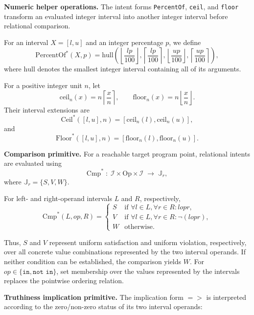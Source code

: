 \documentclass[11pt,oneside]{report}
\theoremstyle{plain}
\theoremstyle{definition}
\theoremstyle{remark}
\begin{document}
\smallskip
\noindent\textbf{Numeric helper operations.} The intent forms \texttt{PercentOf}, \texttt{ceil}, and
\texttt{floor} transform an evaluated integer interval into another integer
interval before relational comparison.

For an interval $X=[l,u]$ and an integer percentage $p$, we define
\[
\mathrm{PercentOf}^{*}(X,p)
=
\mathrm{hull}
\left(
\left\lfloor\frac{lp}{100}\right\rfloor,
\left\lceil\frac{lp}{100}\right\rceil,
\left\lfloor\frac{up}{100}\right\rfloor,
\left\lceil\frac{up}{100}\right\rceil
\right),
\]
where $\mathrm{hull}$ denotes the smallest integer interval containing all
of its arguments.

For a positive integer unit $n$, let
\[
\mathrm{ceil}_{n}(x)
=
n\left\lceil\frac{x}{n}\right\rceil,
\qquad
\mathrm{floor}_{n}(x)
=
n\left\lfloor\frac{x}{n}\right\rfloor.
\]
Their interval extensions are
\[
\mathrm{Ceil}^{*}([l,u],n)
=
[
\mathrm{ceil}_{n}(l),
\mathrm{ceil}_{n}(u)
],
\]
and
\[
\mathrm{Floor}^{*}([l,u],n)
=
[
\mathrm{floor}_{n}(l),
\mathrm{floor}_{n}(u)
].
\]

\smallskip
\noindent\textbf{Comparison primitive.}
For a reachable target program point, relational intents are evaluated using
\[
\mathrm{Cmp}^{*}
\;:\;
\mathcal{I} \times \mathrm{Op} \times \mathcal{I}
\;\to\;
\mathbb{J}_{r},
\]
where \(\mathbb{J}_{r}=\{S,V,W\}\).

For left- and right-operand intervals \(L\) and \(R\), respectively,
\[
\mathrm{Cmp}^{*}(L,\mathit{op},R)
=
\begin{cases}
S
&
\text{if }
\forall l \in L,\forall r \in R :
l \mathrel{\mathit{op}} r,
\\[2pt]
V
&
\text{if }
\forall l \in L,\forall r \in R :
\neg(l \mathrel{\mathit{op}} r),
\\[2pt]
W
&
\text{otherwise.}
\end{cases}
\]

Thus, \(S\) and \(V\) represent uniform satisfaction and uniform violation,
respectively, over all concrete value combinations represented by the two
interval operands.
If neither condition can be established, the comparison yields \(W\).
For
\(\mathit{op}\in\{\texttt{in},\texttt{not in}\}\),
set membership over the values represented by the intervals replaces the
pointwise ordering relation.

\smallskip
\noindent\textbf{Truthiness implication primitive.}
The implication form \({=}{>}\) is interpreted according to the zero/non-zero
status of its two interval operands:
\end{document}
